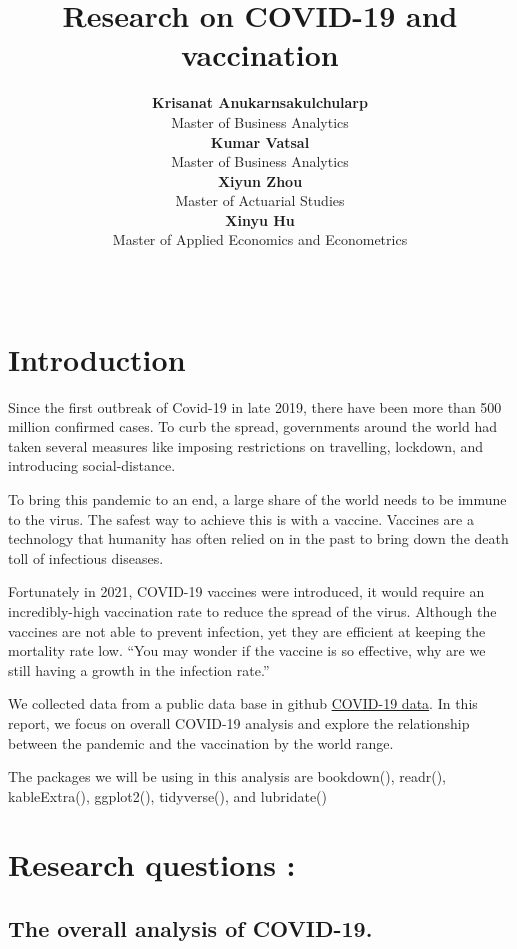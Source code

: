 \documentclass[11pt,a4paper,]{article}
\title{Research on COVID-19 and vaccination}
\author{\sf\Large\textbf{ Krisanat Anukarnsakulchularp}\\ {\sf\large Master of Business Analytics\\[0.5cm]} \sf\Large\textbf{ Kumar Vatsal}\\ {\sf\large Master of Business Analytics\\[0.5cm]} \sf\Large\textbf{ Xiyun Zhou}\\ {\sf\large Master of Actuarial Studies\\[0.5cm]} \sf\Large\textbf{ Xinyu Hu}\\ {\sf\large Master of Applied Economics and Econometrics\\[0.5cm]}}
\date{\sf\Date~\Month~\Year}
\makeatletter
\def\titlepage{\front{\expandafter{\@title}}{\@author}{\@organization}}
\makeatother
\begin{document}
\titlepage

\clearpage

\hypertarget{introduction}{%
\section{\texorpdfstring{\textbf{Introduction}}{Introduction}}\label{introduction}}

Since the first outbreak of Covid-19 in late 2019, there have been more than 500 million confirmed cases. To curb the spread, governments around the world had taken several measures like imposing restrictions on travelling, lockdown, and introducing social-distance.

To bring this pandemic to an end, a large share of the world needs to be immune to the virus. The safest way to achieve this is with a vaccine. Vaccines are a technology that humanity has often relied on in the past to bring down the death toll of infectious diseases.

Fortunately in 2021, COVID-19 vaccines were introduced, it would require an incredibly-high vaccination rate to reduce the spread of the virus. Although the vaccines are not able to prevent infection, yet they are efficient at keeping the mortality rate low. ``You may wonder if the vaccine is so effective, why are we still having a growth in the infection rate.''

We collected data from a public data base in github \href{https://github.com/owid/covid-19-data/tree/master/public/data}{COVID-19 data}. In this report, we focus on overall COVID-19 analysis and explore the relationship between the pandemic and the vaccination by the world range.

The packages we will be using in this analysis are bookdown(\textcite{bookdown}), readr(\textcite{readr}), kableExtra(\textcite{kableExtra}), ggplot2(\textcite{ggplot2}), tidyverse(\textcite{tidyverse}), and lubridate(\textcite{lubridate})

\clearpage

\hypertarget{research-questions}{%
\section{\texorpdfstring{\textbf{Research questions} :}{Research questions :}}\label{research-questions}}

\hypertarget{the-overall-analysis-of-covid-19.}{%
\subsection{\texorpdfstring{\textbf{The overall analysis of COVID-19.}}{The overall analysis of COVID-19.}}\label{the-overall-analysis-of-covid-19.}}
\end{document}
